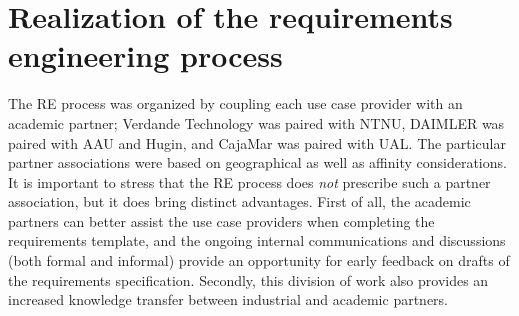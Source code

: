
\section{Realization of the requirements engineering process}
\label{sec:realization}

The RE process was organized by coupling each use case provider with an
academic partner; Verdande Technology was paired with NTNU, DAIMLER was paired with AAU and Hugin, and CajaMar was paired with
UAL. The particular partner associations were based on geographical as well as affinity
considerations. It is important to stress that the RE process does \emph{not} prescribe such a
partner association, but it does bring distinct advantages. First of all, the academic partners can better assist the use case
providers when completing the requirements template, and the ongoing internal communications and discussions (both formal
and informal) provide an opportunity for early feedback on drafts of the requirements
specification. Secondly, this division of work also provides an increased knowledge transfer between industrial and academic
partners. 





